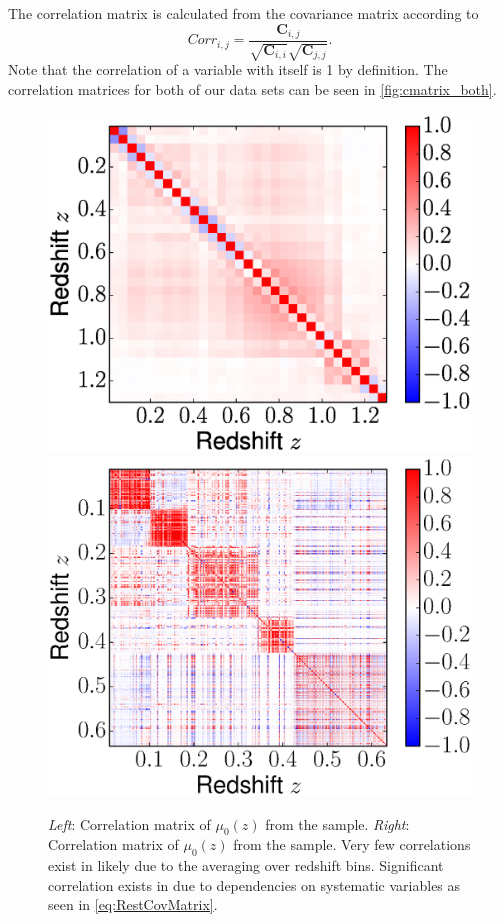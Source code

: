 \documentclass[12pt,a4paper]{article}
\begin{document}
The correlation matrix is calculated from the covariance matrix according to
%
\begin{equation}
  \label{eq:correlation}
  Corr_{i,j} = \frac{\mathbf{C}_{i,j}}{\sqrt{\mathbf{C}_{i,i}}\sqrt{\mathbf{C}_{j,j}}}.
\end{equation}
%
Note that the correlation of a variable with itself is 1 by definition.
The correlation matrices for both of our data sets can be seen in
\autoref{fig:cmatrix_both}.
%
\begin{figure}
  \includegraphics[width=0.5\linewidth]{figures/Betoule_correlation.eps}
  \includegraphics[width=0.5\linewidth]{figures/Rest_correlation.eps}
  \caption{{\it Left}: Correlation matrix of $\mu_0(z)$ from the
    \citet{betoule2014} sample. {\it Right}: Correlation matrix of $\mu_0(z)$ from 
	the \citet{rest2014} sample. Very few correlations exist in 
        \citet{betoule2014} likely due to the averaging over redshift bins. 
	Significant correlation exists in \citet{rest2014} due to dependencies 
	on systematic variables as seen in \autoref{eq:RestCovMatrix}.}
  \label{fig:cmatrix_both}
\end{figure}
\end{document}
